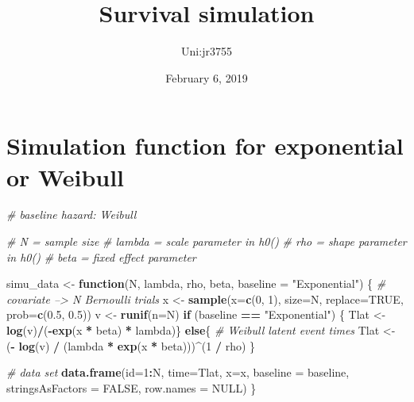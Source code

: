 \documentclass[]{article}
\title{Survival simulation}
\author{Uni:jr3755}
\date{February 6, 2019}
\newenvironment{Shaded}{\begin{snugshade}}{\end{snugshade}}
\newcommand{\KeywordTok}[1]{\textcolor[rgb]{0.13,0.29,0.53}{\textbf{#1}}}
\newcommand{\DataTypeTok}[1]{\textcolor[rgb]{0.13,0.29,0.53}{#1}}
\newcommand{\DecValTok}[1]{\textcolor[rgb]{0.00,0.00,0.81}{#1}}
\newcommand{\FloatTok}[1]{\textcolor[rgb]{0.00,0.00,0.81}{#1}}
\newcommand{\StringTok}[1]{\textcolor[rgb]{0.31,0.60,0.02}{#1}}
\newcommand{\CommentTok}[1]{\textcolor[rgb]{0.56,0.35,0.01}{\textit{#1}}}
\newcommand{\OtherTok}[1]{\textcolor[rgb]{0.56,0.35,0.01}{#1}}
\newcommand{\ControlFlowTok}[1]{\textcolor[rgb]{0.13,0.29,0.53}{\textbf{#1}}}
\newcommand{\OperatorTok}[1]{\textcolor[rgb]{0.81,0.36,0.00}{\textbf{#1}}}
\newcommand{\NormalTok}[1]{#1}
\begin{document}
\maketitle

\section{Simulation function for exponential or
Weibull}\label{simulation-function-for-exponential-or-weibull}

\begin{Shaded}
\begin{Highlighting}[]
\CommentTok{# baseline hazard: Weibull}

\CommentTok{# N = sample size    }
\CommentTok{# lambda = scale parameter in h0()}
\CommentTok{# rho = shape parameter in h0()}
\CommentTok{# beta = fixed effect parameter}

\NormalTok{simu_data <-}\StringTok{ }\ControlFlowTok{function}\NormalTok{(N, lambda, rho, beta, }\DataTypeTok{baseline =} \StringTok{"Exponential"}\NormalTok{)}
\NormalTok{\{}
  \CommentTok{# covariate --> N Bernoulli trials}
\NormalTok{  x <-}\StringTok{ }\KeywordTok{sample}\NormalTok{(}\DataTypeTok{x=}\KeywordTok{c}\NormalTok{(}\DecValTok{0}\NormalTok{, }\DecValTok{1}\NormalTok{), }\DataTypeTok{size=}\NormalTok{N, }\DataTypeTok{replace=}\OtherTok{TRUE}\NormalTok{, }\DataTypeTok{prob=}\KeywordTok{c}\NormalTok{(}\FloatTok{0.5}\NormalTok{, }\FloatTok{0.5}\NormalTok{))}
\NormalTok{  v <-}\StringTok{ }\KeywordTok{runif}\NormalTok{(}\DataTypeTok{n=}\NormalTok{N)}
  \ControlFlowTok{if}\NormalTok{ (baseline }\OperatorTok{==}\StringTok{ "Exponential"}\NormalTok{) \{}
\NormalTok{    Tlat <-}\StringTok{ }\KeywordTok{log}\NormalTok{(v)}\OperatorTok{/}\NormalTok{(}\OperatorTok{-}\KeywordTok{exp}\NormalTok{(x }\OperatorTok{*}\StringTok{ }\NormalTok{beta) }\OperatorTok{*}\StringTok{ }\NormalTok{lambda)\}}
  \ControlFlowTok{else}\NormalTok{\{}
    \CommentTok{# Weibull latent event times}
\NormalTok{    Tlat <-}\StringTok{ }\NormalTok{(}\OperatorTok{-}\StringTok{ }\KeywordTok{log}\NormalTok{(v) }\OperatorTok{/}\StringTok{ }\NormalTok{(lambda }\OperatorTok{*}\StringTok{ }\KeywordTok{exp}\NormalTok{(x }\OperatorTok{*}\StringTok{ }\NormalTok{beta)))}\OperatorTok{^}\NormalTok{(}\DecValTok{1} \OperatorTok{/}\StringTok{ }\NormalTok{rho)}
\NormalTok{  \}}

  \CommentTok{# data set}
  \KeywordTok{data.frame}\NormalTok{(}\DataTypeTok{id=}\DecValTok{1}\OperatorTok{:}\NormalTok{N,}
             \DataTypeTok{time=}\NormalTok{Tlat,}
             \DataTypeTok{x=}\NormalTok{x,}
             \DataTypeTok{baseline =}\NormalTok{ baseline, }\DataTypeTok{stringsAsFactors =} \OtherTok{FALSE}\NormalTok{, }\DataTypeTok{row.names =} \OtherTok{NULL}\NormalTok{)}
\NormalTok{\}}
\end{Highlighting}
\end{Shaded}
\end{document}
